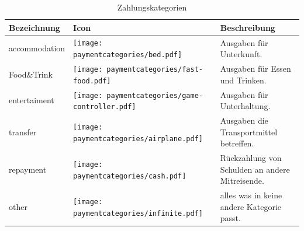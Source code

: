 \begin{table}[H]
\caption{Zahlungskategorien}
\begin{tabularx}{0.95\textwidth}{ |X|X|X| }
\hline
\rowcolor{gray} \textbf{Bezeichnung} & \textbf{Icon} & Beschreibung\\
\hline
accommodation & \texttt{[image: paymentcategories/bed.pdf]} &
Ausgaben für Unterkunft. \\
\hline
	Food\&Trink & \texttt{[image: paymentcategories/fast-food.pdf]} & Ausgaben für Essen und Trinken. \\
\hline
	entertaiment & \texttt{[image: paymentcategories/game-controller.pdf]} & Ausgaben für Unterhaltung.\\
\hline
	transfer & \texttt{[image: paymentcategories/airplane.pdf]}& Ausgaben die Transportmittel betreffen. \\
\hline
	repayment & \texttt{[image: paymentcategories/cash.pdf]} & Rückzahlung von Schulden an andere Mitreisende. \\
\hline
	other & \texttt{[image: paymentcategories/infinite.pdf]} & alles was in keine andere Kategorie passt.\\
\hline
\end{tabularx}
\label{Tab:paymentcategories}
\end{table}

